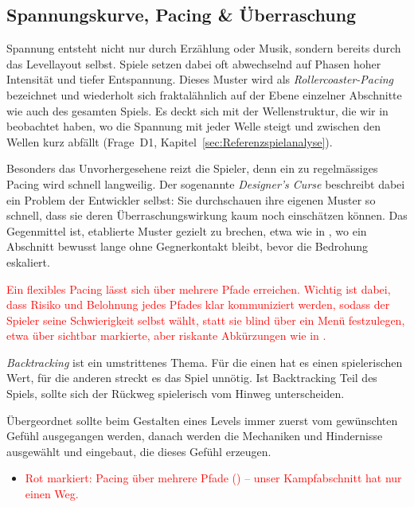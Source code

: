 \documentclass[../Main.tex]{subfiles}
\begin{document}
\subsection{Spannungskurve, Pacing \& Überraschung} \label{sec:Pacing}
Spannung entsteht nicht nur durch Erzählung oder Musik, sondern bereits durch das Levellayout selbst. Spiele setzen dabei oft abwechselnd auf Phasen hoher Intensität und tiefer Entspannung. Dieses Muster wird als \textit{Rollercoaster-Pacing} bezeichnet und wiederholt sich fraktalähnlich auf der Ebene einzelner Abschnitte wie auch des gesamten Spiels.\autocite{gdc_tenprinciples2010} Es deckt sich mit der Wellenstruktur, die wir in  beobachtet haben, wo die Spannung mit jeder Welle steigt und zwischen den Wellen kurz abfällt (Frage~D1, Kapitel~\ref{sec:Referenzspielanalyse}).

Besonders das Unvorhergesehene reizt die Spieler, denn ein zu regelmässiges Pacing wird schnell langweilig. Der sogenannte \textit{Designer's Curse} beschreibt dabei ein Problem der Entwickler selbst: Sie durchschauen ihre eigenen Muster so schnell, dass sie deren Überraschungswirkung kaum noch einschätzen können. Das Gegenmittel ist, etablierte Muster gezielt zu brechen, etwa wie in , wo ein Abschnitt bewusst lange ohne Gegnerkontakt bleibt, bevor die Bedrohung eskaliert.\autocite{gdc_tenprinciples2010}

\textcolor{red}{Ein flexibles Pacing lässt sich über mehrere Pfade erreichen. Wichtig ist dabei, dass Risiko und Belohnung jedes Pfades klar kommuniziert werden, sodass der Spieler seine Schwierigkeit selbst wählt, statt sie blind über ein Menü festzulegen, etwa über sichtbar markierte, aber riskante Abkürzungen wie in .\autocite{gdc_tenprinciples2010}}

\textit{Backtracking} ist ein umstrittenes Thema. Für die einen hat es einen spielerischen Wert, für die anderen streckt es das Spiel unnötig. Ist Backtracking Teil des Spiels, sollte sich der Rückweg spielerisch vom Hinweg unterscheiden.\autocite{gdc_tenprinciples2010}

Übergeordnet sollte beim Gestalten eines Levels immer zuerst vom gewünschten Gefühl ausgegangen werden, danach werden die Mechaniken und Hindernisse ausgewählt und eingebaut, die dieses Gefühl erzeugen.\autocite{gdc_tenprinciples2010}

\begin{itemize}[leftmargin=1.5cm]
    \item \textcolor{red}{Rot markiert: Pacing über mehrere Pfade () -- unser Kampfabschnitt hat nur einen Weg.}
\end{itemize}
\end{document}
